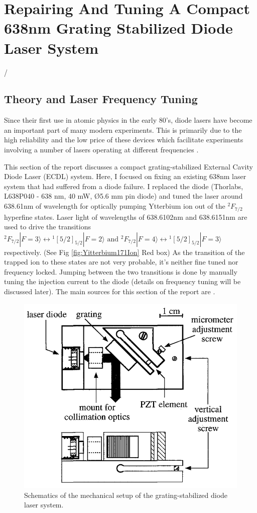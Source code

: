 \documentclass[12pt]{report}
\begin{document}
\chapter{Repairing And Tuning A Compact 638nm Grating Stabilized Diode Laser System}/
\section{Theory and Laser Frequency Tuning}
Since their first use in atomic physics in the early 80's, diode lasers have become an important part of many modern experiments. This is primarily due to the high reliability and the low price of these devices which facilitate experiments involving a number of lasers operating at different frequencies \cite{compactGratingDiodeLaser}.
\par
This section of the report discusses a compact grating-stabilized External Cavity Diode Laser (ECDL) system. Here, I focused on fixing an existing 638nm laser system that had suffered from a diode failure. I replaced the diode (Thorlabs, L638P040 - 638 nm, 40 mW, Ø5.6 mm pin diode) and tuned the laser around 638.61nm of wavelength for optically pumping Ytterbium ion out of the ${ }^2 F_{7 / 2}$ hyperfine states. Laser light of wavelengths of 638.6102nm and 638.6151nm are used to drive the transitions ${ }^2 F_{7 / 2}|F=3\rangle \leftrightarrow{ }^1[5 / 2]_{5 / 2}|F=2\rangle \text { and }{ }^2 F_{7 / 2}|F=4\rangle \leftrightarrow{ }^1[5 / 2]_{5 / 2}|F=3\rangle$ respectively. (See Fig \ref{fig:Yitterbium171Ion} Red box) As the transition of the trapped ion to these states are not very probable, it's neither fine tuned nor frequency locked. Jumping between the two transitions is done by manually tuning the injection current to the diode (details on frequency tuning will be discussed later). The main sources for this section of the report are \cite{compactGratingDiodeLaser}\cite{fundamentalsOfPhotonics}.

\begin{figure}[H]
    \centering
    \includegraphics[width=.8\textwidth]{compactDiodeLaserSchematics.png}
    \caption{Schematics of the mechanical setup of the grating-stabilized diode laser system. \cite{compactGratingDiodeLaser}
    }
    \label{fig:compactDiodeLaserSchematics}
\end{figure}
\end{document}
